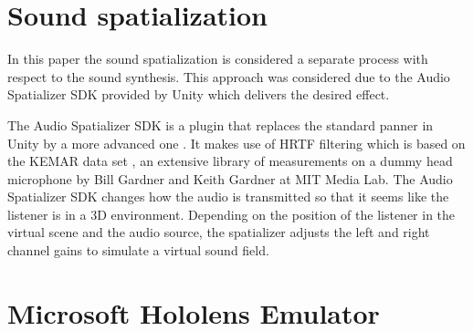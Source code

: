 \section{Sound spatialization}

In this paper the sound spatialization is considered a separate process with respect to the sound synthesis. This approach was considered due to the Audio Spatializer SDK provided by Unity\textsuperscript{\textregistered} which delivers the desired effect.

The Audio Spatializer SDK is a plugin that replaces the standard panner in Unity\textsuperscript{\textregistered} by a more advanced one \cite{bib:unity_doc}. It makes use of \gls{HRTF} filtering which is based on the KEMAR data set \cite{kemar}, an extensive library of  measurements on a dummy head microphone by Bill Gardner and Keith Gardner at MIT Media Lab. The Audio Spatializer SDK changes how the audio is transmitted so that it seems like the listener is in a 3D environment. Depending on the position of the listener in the virtual scene and the audio source, the spatializer adjusts the left and right channel gains to simulate a virtual sound field.

\section{Microsoft Hololens Emulator}

